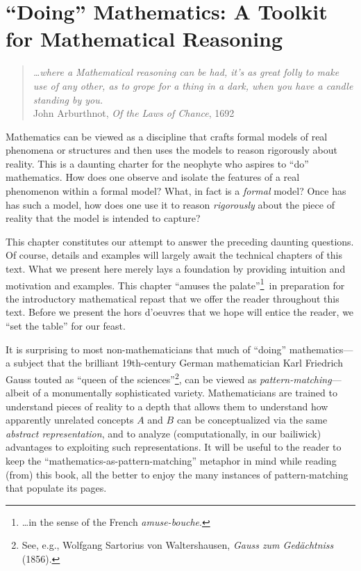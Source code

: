 
\chapter{``Doing'' Mathematics:
A Toolkit for Mathematical Reasoning}
\label{ch:doingmath}


\begin{quote}
{\em \ldots where a Mathematical reasoning can be had, it's as great
  folly to make use of any other, as to grope for a thing in a dark,
  when you have a candle standing by you.} \\
\hspace*{2in} John Arburthnot, {\it Of the Laws of Chance}, 1692
\end{quote}

\noindent
Mathematics can be viewed as a discipline that crafts formal models of real phenomena or structures and then uses the models to reason rigorously about reality.  This is a daunting charter for the neophyte who aspires to ``do'' mathematics.  How does one observe and isolate
the features of a real phenomenon within a formal model?  What, in fact is a {\em formal} model?  Once has has such a model, how does one use it to reason {\em rigorously} about the piece of reality that the model is intended to capture?

This chapter constitutes our attempt to answer the preceding daunting questions.  Of course, details and examples will largely await the technical chapters of this text.  What we present here merely lays a foundation by providing intuition and motivation and examples.  This chapter ``amuses the palate''\footnote{\ldots in the sense of the French {\em amuse-bouche}.}~in preparation for the introductory mathematical repast that we offer the reader throughout this text.   Before we present the hors d'oeuvres that we hope will entice the reader, we ``set the table'' for our feast.

\medskip

It is surprising to most non-mathematicians that much of ``doing'' mathematics---a subject that the brilliant 19th-century German mathematician Karl Friedrich Gauss touted as ``queen of the sciences''\footnote{See, e.g., Wolfgang Sartorius von Waltershausen, {\it Gauss zum Ged\"{a}chtniss} (1856).}, can be viewed as {\em pattern-matching}---albeit of a monumentally sophisticated variety.  Mathematicians are trained to understand pieces of reality to a depth that allows them to understand how apparently unrelated concepts $A$ and $B$ can be conceptualized via the same {\em abstract representation}, and to analyze (computationally, in our bailiwick) advantages to exploiting such representations.  It will be useful to the reader to keep the ``mathematics-as-pattern-matching'' metaphor in mind while reading (from) this book, all the better to enjoy the many instances of pattern-matching that populate its pages.


